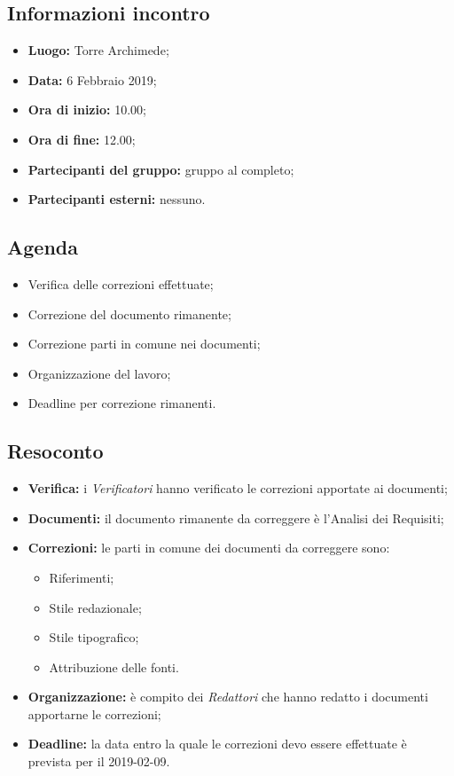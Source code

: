 \subsection{Informazioni incontro}
\begin{itemize}
	\item { \textbf{Luogo:} Torre Archimede};
	\item { \textbf{Data:} 6 Febbraio 2019};
	\item { \textbf{Ora di inizio:} 10.00};
	\item { \textbf{Ora di fine:} 12.00};
	\item { \textbf{Partecipanti del gruppo:} gruppo al completo};
	\item { \textbf{Partecipanti esterni:} nessuno}.
\end{itemize}


\subsection{Agenda}
\begin{itemize}
	\item {Verifica delle correzioni effettuate;}
	\item {Correzione del documento rimanente;}
	\item {Correzione parti in comune nei documenti;}
	\item {Organizzazione del lavoro;}
	\item {Deadline per correzione rimanenti.}
\end{itemize}

\subsection{Resoconto}
\begin{itemize}
	\item { \textbf{Verifica:} i \emph{Verificatori} hanno verificato le correzioni apportate ai documenti;}
	\item{ \textbf{Documenti:} il documento rimanente da correggere è l'Analisi dei Requisiti;}
	\item { \textbf{Correzioni:} le parti in comune dei documenti da correggere sono: 
		\begin{itemize}
			\item Riferimenti;
			\item Stile redazionale;
			\item Stile tipografico;
			\item Attribuzione delle fonti.
		\end{itemize}
	}	
	\item { \textbf{Organizzazione:} è compito dei \emph{Redattori} che hanno redatto i documenti apportarne le correzioni;}	
	\item { \textbf{Deadline:} la data entro la quale le correzioni devo essere effettuate è prevista per il 2019-02-09.}
\end{itemize}

